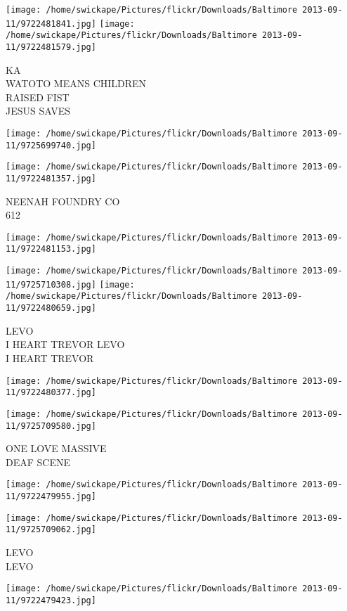 \documentclass[10pt,letterpaper]{article}
\begin{document}
\texttt{[image: /home/swickape/Pictures/flickr/Downloads/Baltimore 2013-09-11/9722481841.jpg]}
\texttt{[image: /home/swickape/Pictures/flickr/Downloads/Baltimore 2013-09-11/9722481579.jpg]}

KA\\
WATOTO MEANS CHILDREN\\
RAISED FIST\\
JESUS SAVES
\pagebreak

\texttt{[image: /home/swickape/Pictures/flickr/Downloads/Baltimore 2013-09-11/9725699740.jpg]}

\vspace{0.25in}
\texttt{[image: /home/swickape/Pictures/flickr/Downloads/Baltimore 2013-09-11/9722481357.jpg]}

NEENAH FOUNDRY CO\\
612
\pagebreak

\texttt{[image: /home/swickape/Pictures/flickr/Downloads/Baltimore 2013-09-11/9722481153.jpg]}

\vspace{0.25in}
\texttt{[image: /home/swickape/Pictures/flickr/Downloads/Baltimore 2013-09-11/9725710308.jpg]}
\texttt{[image: /home/swickape/Pictures/flickr/Downloads/Baltimore 2013-09-11/9722480659.jpg]}

LEVO\\
I HEART TREVOR LEVO\\
I HEART TREVOR
\pagebreak

\texttt{[image: /home/swickape/Pictures/flickr/Downloads/Baltimore 2013-09-11/9722480377.jpg]}

\vspace{0.25in}
\texttt{[image: /home/swickape/Pictures/flickr/Downloads/Baltimore 2013-09-11/9725709580.jpg]}

ONE LOVE MASSIVE\\
DEAF SCENE
\pagebreak

\texttt{[image: /home/swickape/Pictures/flickr/Downloads/Baltimore 2013-09-11/9722479955.jpg]}

\vspace{0.25in}
\texttt{[image: /home/swickape/Pictures/flickr/Downloads/Baltimore 2013-09-11/9725709062.jpg]}

LEVO\\
LEVO
\pagebreak

\texttt{[image: /home/swickape/Pictures/flickr/Downloads/Baltimore 2013-09-11/9722479423.jpg]}
\end{document}
